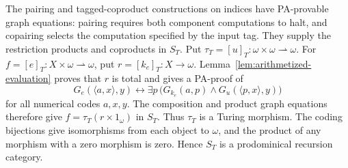 The pairing and tagged-coproduct constructions on indices have
PA-provable graph equations: pairing requires both component
computations to halt, and copairing selects the computation
specified by the input tag. They supply the restriction products
and coproducts in $S_T$.
Put $\tau_T=[u]_T:\omega\times\omega\rightharpoonup\omega$.
For $f=[e]_T:X\times\omega\rightharpoonup\omega$, put
$r=[k_e]_T:X\to\omega$. Lemma~\ref{lem:arithmetized-evaluation}
proves that $r$ is total and gives a PA-proof of
\[
 G_e(\langle a,x\rangle,y)\leftrightarrow
 \exists p\,
 \bigl(G_{k_e}(a,p)\land G_u(\langle p,x\rangle,y)\bigr)
\]
for all numerical codes $a,x,y$.
The composition and product graph equations therefore give
$f=\tau_T(r\times1_\omega)$ in $S_T$.
Thus $\tau_T$ is a Turing morphism. The coding bijections give
isomorphisms from each object to $\omega$, and the product
of any morphism with a zero morphism is zero. Hence $S_T$ is a
prodominical recursion category.

